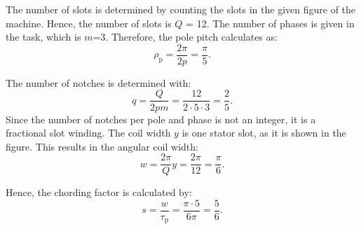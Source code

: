 \begin{solutionblock}
    The number of slots is determined by counting the slots in the given figure of the machine.
    Hence, the number of slots is $Q$ = 12. The number of phases is given in the task, which is $m$=3.
    Therefore, the pole pitch calculates as:
    \begin{equation}
        \rho_{\mathrm{p}} = \frac{2\pi}{2p}
        = \frac{\pi}{5}.
    \end{equation}

    The number of notches is determined with:
    \begin{equation}
        q = \frac{Q}{2pm}
        = \frac{12}{2 \cdot 5 \cdot 3}
        = \frac{2}{5}.
    \end{equation}
    Since the number of notches per pole and phase is not an integer, it is a fractional slot winding.
    The coil width $y$ is one stator slot, as it is shown in the figure. This results in the angular coil width:
    \begin{equation}
        w = \frac{2\pi}{Q} y
        = \frac{2\pi}{12}
        = \frac{\pi}{6}.
    \end{equation}

    Hence, the chording factor is calculated by:
    \begin{equation}
        s = \frac{w}{\tau_{\mathrm{p}}}
        = \frac{\pi \cdot 5}{6\pi}
        = \frac{5}{6}.
    \end{equation}

\end{solutionblock}


